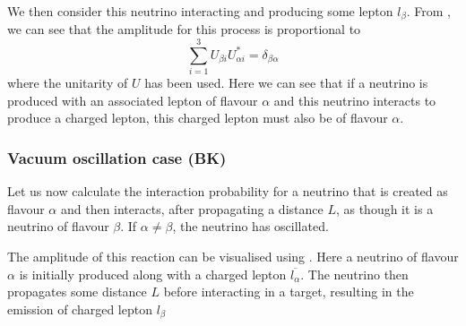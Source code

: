 We then consider this neutrino interacting and producing some lepton $l_{\beta}$.
From , we can see that the amplitude for this process is proportional to
\begin{equation}
  \sum_{i=1}^{3} U_{\beta i}U_{\alpha i}^{*} = \delta_{\beta \alpha}
\end{equation}
where the unitarity of $U$ has been used.
Here we can see that if a neutrino is produced with an associated lepton of flavour $\alpha$ and this neutrino interacts to produce a charged lepton, this charged lepton must also be of flavour $\alpha$.

\subsubsection{Vacuum oscillation case (BK)}

Let us now calculate the interaction probability for a neutrino that is created as flavour $\alpha$ and then interacts, after propagating a distance $L$, as though it is a neutrino of flavour $\beta$.
If $\alpha \neq \beta$, the neutrino has oscillated.

The amplitude of this reaction can be visualised using .
Here a neutrino of flavour $\alpha$ is initially produced along with a charged lepton $\overline{l_{\alpha}}$.
The neutrino then propagates some distance $L$ before interacting in a target, resulting in the emission of charged lepton $l_{\beta}$


